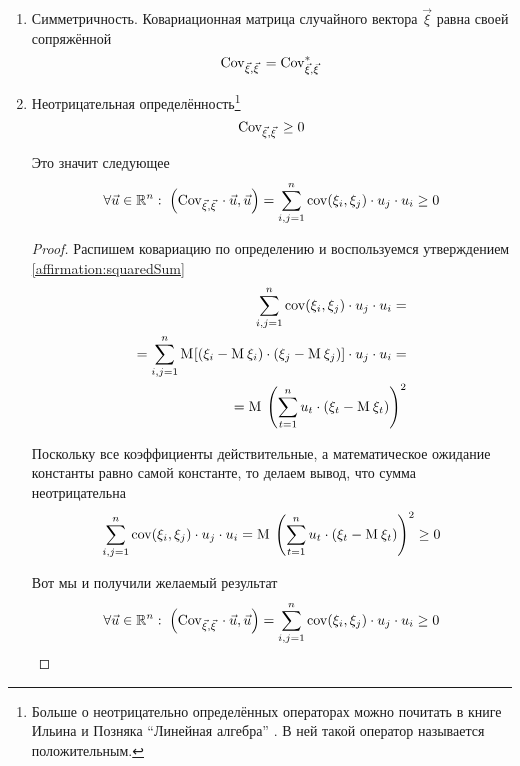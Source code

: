 \begin{enumerate}
    \item Симметричность. Ковариационная матрица случайного вектора $\vec{\xi}$
        равна своей сопряжённой
        $$\mathrm{Cov}_{\vec{\xi}, \vec{\xi}}\, = \mathrm{Cov}_{\vec{\xi}, \vec{\xi}}^*\,$$
    \item Неотрицательная определённость\footnote{Больше о неотрицательно
            определённых операторах можно почитать в книге Ильина и Позняка
            ``Линейная алгебра'' \cite[с.~139]{IlinPoznyarLA}.
            В ней такой оператор называется положительным.}
        $$\mathrm{Cov}_{\vec{\xi}, \vec{\xi}}\, \ge 0$$

        Это значит следующее
        $$\forall \vec{u} \in \mathbb{R}^n:\;
            \left( \mathrm{Cov}_{\vec{\xi}, \vec{\xi}}\, \cdot \vec{u}, \vec{u} \right)
            = \sum_{i,j=1}^{n} \mathrm{cov}\!\left( \xi_i, \xi_j \right) \cdot u_j \cdot u_i
            \ge 0$$

        \begin{proof}
            Распишем ковариацию по определению и воспользуемся утверждением
            \ref{affirmation:squaredSum}
            \begin{align*}
                \sum_{i,j=1}^{n} \mathrm{cov}\!\left( \xi_i, \xi_j \right) \cdot u_j \cdot u_i = \\
                = \sum_{i,j=1}^{n} \mathrm{M}_{}\!\left[ \left( \xi_i - \mathrm{M}_{}\,\xi_i \right)
                        \cdot \left( \xi_j - \mathrm{M}_{}\,\xi_j \right) \right]
                        \cdot u_j \cdot u_i =\\
                = \mathrm{M}_{}\,\left( \sum_{t=1}^{n} u_t
                    \cdot \left( \xi_t - \mathrm{M}_{}\,\xi_t \right) \right)^2
            \end{align*}

            Поскольку все коэффициенты действительные, а математическое
            ожидание константы равно самой константе, то делаем вывод,
            что сумма неотрицательна
            $$\sum_{i,j=1}^{n} \mathrm{cov}\!\left( \xi_i, \xi_j \right) \cdot u_j \cdot u_i
                = \mathrm{M}_{}\,\left( \sum_{t=1}^{n} u_t
                    \cdot \left( \xi_t - \mathrm{M}_{}\,\xi_t \right) \right)^2
                \ge 0$$

            Вот мы и получили желаемый результат
            $$\forall \vec{u} \in \mathbb{R}^n:\;
                \left( \mathrm{Cov}_{\vec{\xi}, \vec{\xi}}\, \cdot \vec{u}, \vec{u} \right)
                = \sum_{i,j=1}^{n} \mathrm{cov}\!\left( \xi_i, \xi_j \right) \cdot u_j \cdot u_i
                \ge 0$$
        \end{proof}
\end{enumerate}

